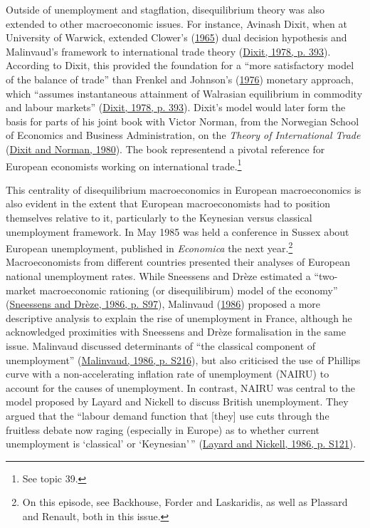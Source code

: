 \documentclass[
  12pt,
  onecolumn]{article}
\begin{document}
Outside of unemployment and stagflation, disequilibrium theory was also extended to other macroeconomic issues. For instance, Avinash Dixit, when at University of Warwick, extended Clower's (\protect\hyperlink{ref-clower1965}{1965}) dual decision hypothesis and Malinvaud's framework to international trade theory (\protect\hyperlink{ref-dixit1978}{Dixit, 1978, p. 393}). According to Dixit, this provided the foundation for a ``more satisfactory model of the balance of trade'' than Frenkel and Johnson's (\protect\hyperlink{ref-frenkel1976}{1976}) monetary approach, which ``assumes instantaneous attainment of Walrasian equilibrium in commodity and labour markets'' (\protect\hyperlink{ref-dixit1978}{Dixit, 1978, p. 393}). Dixit's model would later form the basis for parts of his joint book with Victor Norman, from the Norwegian School of Economics and Business Administration, on the \emph{Theory of International Trade} (\protect\hyperlink{ref-dixit1980}{Dixit and Norman, 1980}). The book representend a pivotal reference for European economists working on international trade.\footnote{See topic 39.}

This centrality of disequilibrium macroeconomics in European macroeconomics is also evident in the extent that European macroeconomists had to position themselves relative to it, particularly to the Keynesian versus classical unemployment framework. In May 1985 was held a conference in Sussex about European unemployment, published in \emph{Economica} the next year.\footnote{On this episode, see Backhouse, Forder and Laskaridis, as well as Plassard and Renault, both in this issue.} Macroeconomists from different countries presented their analyses of European national unemployment rates. While Sneessens and Drèze estimated a ``two-market macroeconomic rationing (or disequilibirum) model of the economy'' (\protect\hyperlink{ref-sneessens1986}{Sneessens and Drèze, 1986, p. S97}), Malinvaud (\protect\hyperlink{ref-malinvaud1986}{1986}) proposed a more descriptive analysis to explain the rise of unemployment in France, although he acknowledged proximities with Sneessens and Drèze formalisation in the same issue. Malinvaud discussed determinants of ``the classical component of unemployment'' (\protect\hyperlink{ref-malinvaud1986}{Malinvaud, 1986, p. S216}), but also criticised the use of Phillips curve with a non-accelerating inflation rate of unemployment (NAIRU) to account for the causes of unemployment. In contrast, NAIRU was central to the model proposed by Layard and Nickell to discuss British unemployment. They argued that the ``labour demand function that {[}they{]} use cuts through the fruitless debate now raging (especially in Europe) as to whether current unemployment is `classical' or `Keynesian'\,'' (\protect\hyperlink{ref-layard1986}{Layard and Nickell, 1986, p. S121}).
\end{document}
